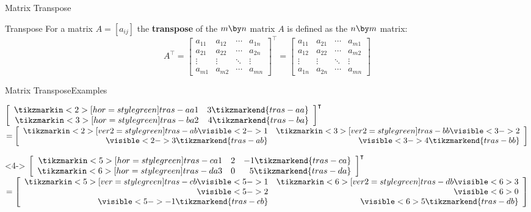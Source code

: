 \documentclass{beamer}
\begin{document}
\begin{frame}{Matrix Transpose}
\begin{block}{Transpose}
For a matrix $A=[a_{ij}]$ the \textbf{transpose} of  the $m \by n$ matrix $A$ is defined as the $n \by m$ matrix:
\begin{equation*}
A^\intercal = 
\begin{bmatrix}
a_{11}&a_{12}&\cdots&a_{1n}\\
a_{21}&a_{22}&\cdots&a_{2n}\\
\vdots&\vdots&\ddots&\vdots\\
a_{m1}&a_{m2}&\cdots&a_{mn}
\end{bmatrix}^\intercal=
\begin{bmatrix}
a_{11}&a_{21}&\cdots&a_{m1}\\
a_{12}&a_{22}&\cdots&a_{m2}\\
\vdots&\vdots&\ddots&\vdots\\
a_{1n}&a_{2n}&\cdots&a_{mn}
\end{bmatrix}
\end{equation*}
\end{block}
\end{frame}
\begin{frame}{Matrix Transpose}{Examples}
\begin{example}
\centering
$\left[
	\begin{array}{rr}
		\tikzmarkin<2>[hor=style green]{tras-aa}1 & 3 \tikzmarkend{tras-aa}\\
		\tikzmarkin<3>[hor=style green]{tras-ba}2 & 4 \tikzmarkend{tras-ba}
	\end{array}
\right]^\intercal $
$= 
\left[
	\begin{array}{rr}
		\tikzmarkin<2>[ver2=style green]{tras-ab}\visible<2->{1} & \tikzmarkin<3>[ver2=style green]{tras-bb} \visible<3->{2} \\
		 \visible<2->{3} \tikzmarkend{tras-ab}& \visible<3->{4} \tikzmarkend{tras-bb}
	\end{array}
\right]$
\end{example}
\begin{example}<4->
\centering
$\left[
	\begin{array}{rrr}
		\tikzmarkin<5>[hor=style green]{tras-ca}1 & 2 & -1 \tikzmarkend{tras-ca}\\
		\tikzmarkin<6>[hor=style green]{tras-da}3 & 0 & 5 \tikzmarkend{tras-da}
	\end{array}
\right]^\intercal $
$= 
\left[
	\begin{array}{rr}
		\tikzmarkin<5>[ver=style green]{tras-cb}\visible<5->{1} & \tikzmarkin<6>[ver2=style green]{tras-db} \visible<6>{3} \\
		\visible<5->{2} & \visible<6>{0} \\
		\visible<5->{-1} \tikzmarkend{tras-cb}& \visible<6>{5} \tikzmarkend{tras-db}
	\end{array}
\right]$
\end{example}
\end{frame}
\end{document}
